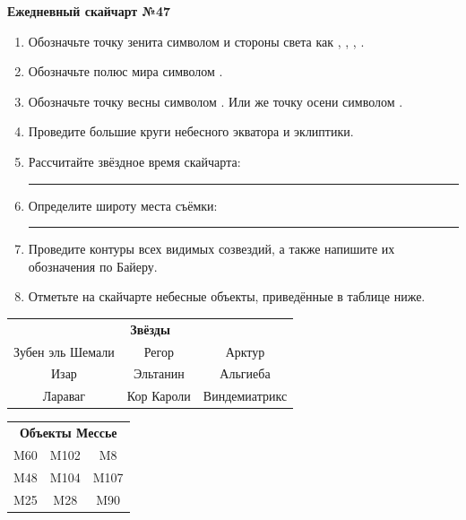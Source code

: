 \documentclass{./SAS-class-skygen}
\begin{document}
    
    
    
	\begin{center}
		\large\textbf{Ежедневный скайчарт №47}
	\end{center}

	\begin{enumerate}
		\item Обозначьте точку зенита символом  и стороны света как , , , .
		\item Обозначьте полюс мира символом .
		\item Обозначьте точку весны символом \Aries. Или же точку осени символом \Libra.
		\item Проведите большие круги небесного экватора и эклиптики.
		\item Рассчитайте звёздное время скайчарта: \rule{2cm}{0.4pt}
		\item Определите широту места съёмки: \rule{2cm}{0.4pt}
		\item Проведите контуры всех видимых созвездий, а также напишите их обозначения по Байеру.
		\item Отметьте на скайчарте небесные объекты, приведённые в таблице ниже.
	\end{enumerate}
	
    \vspace{0.5cm}

    \begin{table}[h!]
    \centering
    \begin{tabular}{ccc}
    \multicolumn{3}{c}{\textbf{Звёзды}} \\ Зубен эль Шемали & Регор & Арктур \\
Изар & Эльтанин & Альгиеба \\
Лараваг & Кор Кароли & Виндемиатрикс \\

\end{tabular}
    \hfill
    \begin{tabular}{ccc}
    \multicolumn{3}{c}{\textbf{Объекты Мессье}} \\ M60 & M102 & M8 \\
M48 & M104 & M107 \\
M25 & M28 & M90 \\

\end{tabular}
    \end{table}
	
\end{document}
